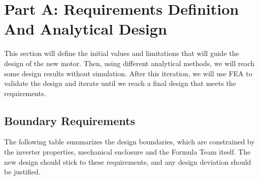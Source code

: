 \documentclass[10pt,final,journal,a4paper,oneside,twocolumn]{IEEEtran}
\begin{document}
\section{Part A: Requirements Definition And Analytical Design}
\label{SEC:PartA}
This section will define the initial values and limitations that will guide the design of the new motor. Then, using different analytical methods, we will reach some design results without simulation. After this iteration, we will use FEA to validate the design and iterate until we reach a final design that meets the requirements.

\subsection{Boundary Requirements}
The following table summarizes the design boundaries, which are constrained by the inverter properties, mechanical enclosure and the Formula Team itself. The new design should stick to these requirements, and any design deviation should be justified.
\end{document}
